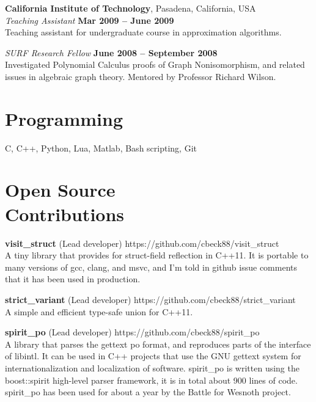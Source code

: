 \documentclass[margin,line]{resume}
\begin{document}
\begin{resume}
    \textbf{California Institute of Technology}, Pasadena, California, USA \vspace{2mm}\\\vspace{1mm}%
    \textsl{Teaching Assistant} \hfill \textbf{Mar 2009 -- June 2009}\\
    Teaching assistant for undergraduate course in approximation algorithms.


    \textsl{SURF Research Fellow} \hfill \textbf{June 2008 -- September 2008}\\
    Investigated Polynomial Calculus proofs of Graph Nonisomorphism, and related issues in algebraic graph theory.
    Mentored by Professor Richard Wilson.
       

\newpage

    \section{\mysidestyle Programming} 

    C, C++, Python, Lua, Matlab, Bash scripting, Git

    \section{\mysidestyle Open Source\\Contributions}

    \textbf{visit\_struct} (Lead developer) \hfill https://github.com/cbeck88/visit\_struct \\
    A tiny library that provides for struct-field reflection in C++11. It is portable to many versions of gcc, clang, and msvc,
    and I'm told in github issue comments that it has been used in production.

    \textbf{strict\_variant} (Lead developer) \hfill https://github.com/cbeck88/strict\_variant \\
    A simple and efficient type-safe union for C++11.

    \textbf{spirit\_po} (Lead developer) \hfill https://github.com/cbeck88/spirit\_po \\
    A library that parses the gettext po format, and reproduces parts of the interface of libintl.
    It can be used in C++ projects that use the GNU gettext system for internationalization and localization of software.
    spirit\_po is written using the boost::spirit high-level parser framework, it is in total about 900 lines of code.
    spirit\_po has been used for about a year by the Battle for Wesnoth project.


\end{resume}
\end{document}
